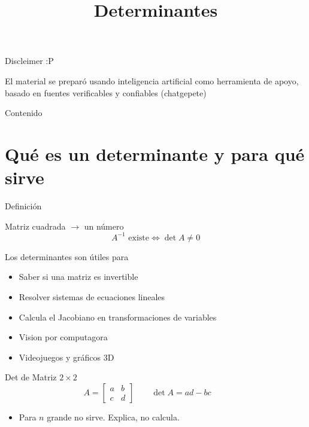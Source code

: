 \documentclass[aspectratio=169,11pt]{beamer}
\title{Determinantes}
\author{\alumnouno \and \alumnodos}
\institute{\materia, INAOE}
\date{\periodo}
\newcommand{\dt}[1]{\det #1}
\newcommand{\mat}[1]{%
  \begin{bmatrix} #1 \end{bmatrix}%
}
\begin{document}

\maketitle

\begin{frame}{Discleimer :P}

    El material se preparó usando inteligencia artificial como
    herramienta de apoyo, basado en fuentes verificables y confiables (chatgepete)

\end{frame}

\begin{frame}[t]{Contenido}
  \small
  \tableofcontents
\end{frame}

\section{Qué es un determinante y para qué sirve}

\begin{frame}{Definición}
  \begin{block}{Matriz cuadrada $\longrightarrow$ un número}
    \[
      A^{-1} \text{ existe}
      \iff
      \dt{A} \neq 0
    \]
  \end{block}

  Los determinantes son útiles para
  \begin{itemize}
    \item Saber si una matriz es invertible
    \item Resolver sistemas de ecuaciones lineales
    \item Calcula el Jacobiano en transformaciones de variables
    \item Vision por computagora
    \item Videojuegos y gráficos 3D
  \end{itemize}
\end{frame}

\begin{frame}{Det de Matriz $2 \times 2$}
  \[
    A = \mat{a & b \\ c & d}
    \qquad
    \dt{A} = ad - bc
    \qquad
  \]

  \begin{itemize}
    \item Para $n$ grande no sirve. Explica, no calcula.
  \end{itemize}
\end{frame}
\end{document}

